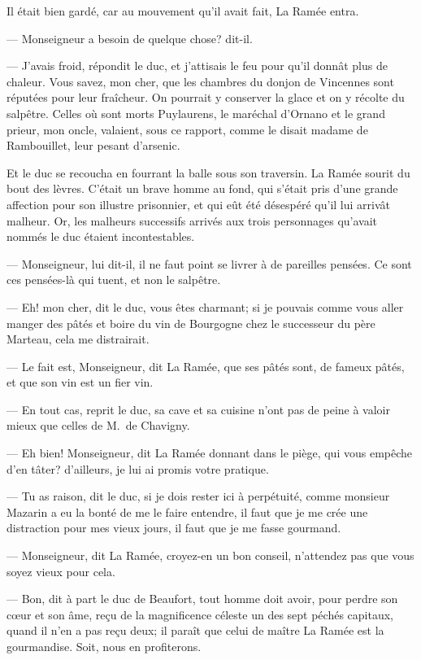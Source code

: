 Il était bien gardé, car au mouvement qu'il avait fait, La Ramée entra.

— Monseigneur a besoin de quelque chose? dit-il.

— J'avais froid, répondit le duc, et j'attisais le feu pour qu'il donnât plus de chaleur. Vous savez, mon cher, que les chambres du donjon de Vincennes sont réputées pour leur fraîcheur. On pourrait y conserver la glace et on y récolte du salpêtre. Celles où sont morts Puylaurens, le maréchal d'Ornano et le grand prieur, mon oncle, valaient, sous ce rapport, comme le disait madame de Rambouillet, leur pesant d'arsenic.

Et le duc se recoucha en fourrant la balle sous son traversin. La Ramée sourit du bout des lèvres. C'était un brave homme au fond, qui s'était pris d'une grande affection pour son illustre prisonnier, et qui eût été désespéré qu'il lui arrivât malheur. Or, les malheurs successifs arrivés aux trois personnages qu'avait nommés le duc étaient incontestables.

— Monseigneur, lui dit-il, il ne faut point se livrer à de pareilles pensées. Ce sont ces pensées-là qui tuent, et non le salpêtre.

— Eh! mon cher, dit le duc, vous êtes charmant; si je pouvais comme vous aller manger des pâtés et boire du vin de Bourgogne chez le successeur du père Marteau, cela me distrairait.

— Le fait est, Monseigneur, dit La Ramée, que ses pâtés sont, de fameux pâtés, et que son vin est un fier vin.

— En tout cas, reprit le duc, sa cave et sa cuisine n'ont pas de peine à valoir mieux que celles de M.~de Chavigny.

— Eh bien! Monseigneur, dit La Ramée donnant dans le piège, qui vous empêche d'en tâter? d'ailleurs, je lui ai promis votre pratique.

— Tu as raison, dit le duc, si je dois rester ici à perpétuité, comme monsieur Mazarin a eu la bonté de me le faire entendre, il faut que je me crée une distraction pour mes vieux jours, il faut que je me fasse gourmand.

— Monseigneur, dit La Ramée, croyez-en un bon conseil, n'attendez pas que vous soyez vieux pour cela.

— Bon, dit à part le duc de Beaufort, tout homme doit avoir, pour perdre son cœur et son âme, reçu de la magnificence céleste un des sept péchés capitaux, quand il n'en a pas reçu deux; il paraît que celui de maître La Ramée est la gourmandise. Soit, nous en profiterons.

